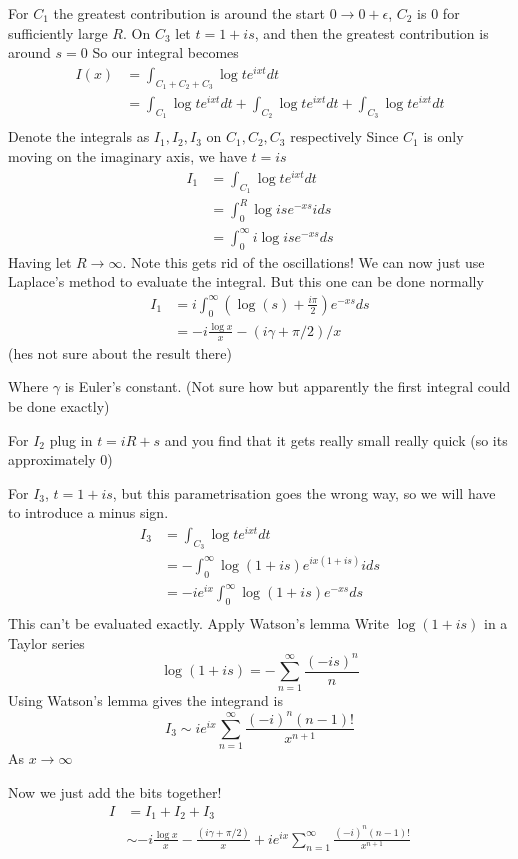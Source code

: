 \documentclass{X:/Documents/Coding/Latex/myassignment}
\begin{document}
For $C_1$ the greatest contribution is around the start $0\to 0+\epsilon$, $C_2$ is $0$ for sufficiently large $R$.
On $C_3$ let $t= 1 + is$, and then the greatest contribution is around $s=0$ 
So our integral becomes
\begin{align*}
I(x) &= \int_{C_1+C_2+C_3} \log t e^{ixt} dt\\
&= \int_{C_1} \log t e^{ixt}dt + \int_{C_2} \log t e^{ixt}dt + \int_{C_3} \log t e^{ixt}dt\\
\end{align*}
Denote the integrals as $I_1,I_2,I_3$ on $C_1,C_2,C_3$ respectively
Since $C_1$ is only moving on the imaginary axis, we have $t=is$
\begin{align*}
    I_1 &= \int_{C_1} \log t e^{ixt} dt\\
    &= \int_0^R \log is e^{-xs} ids\\
    &= \int_0^\infty i\log is e^{-xs}  ds
\end{align*}
Having let $R\to\infty$. Note this gets rid of the oscillations! We can now just use Laplace's method to evaluate the integral. But this one can be done normally
\begin{align*}
    I_1 &=i\int_0^\infty \left(\log(s) + \frac{i\pi}{2}\right) e^{-xs} ds\\
    &=-i\frac{\log x}{x} - (i\gamma + \pi/2)/x
\end{align*}
(hes not sure about the result there)

Where $\gamma$ is Euler's constant.
(Not sure how but apparently the first integral could be done exactly)

For $I_2$ plug in $t=iR+s$ and you find that it gets really small really quick (so its approximately $0$)

For $I_3$, $t=1+is$, but this parametrisation goes the wrong way, so we will have to introduce a minus sign.
\begin{align*}
    I_3 &= \int_{C_3} \log t e^{ixt} dt\\
    &= -\int_{0}^{\infty}\log (1+is) e^{ix(1+is)}ids\\
    &= -ie^{ix}\int_{0}^{\infty}\log (1+is) e^{-xs}ds\\
\end{align*}
This can't be evaluated exactly. Apply Watson's lemma
Write $\log(1+is)$ in a Taylor series
\[\log(1+is) = -\sum_{n=1}^\infty \frac{(-is)^n}{n}\]
Using Watson's lemma gives the integrand is 
\[I_3 \sim ie^{ix} \sum_{n=1}^\infty \frac{(-i)^n (n-1)!}{x^{n+1}}\]
As $x\to\infty$

Now we just add the bits together!
\begin{align*}
    I &= I_1 + I_2 + I_3\\
    &\sim -i\frac{\log x}{x} - \frac{(i\gamma + \pi/2)}{x} + ie^{ix} \sum_{n=1}^\infty \frac{(-i)^n (n-1)!}{x^{n+1}}
\end{align*}
\end{document}
